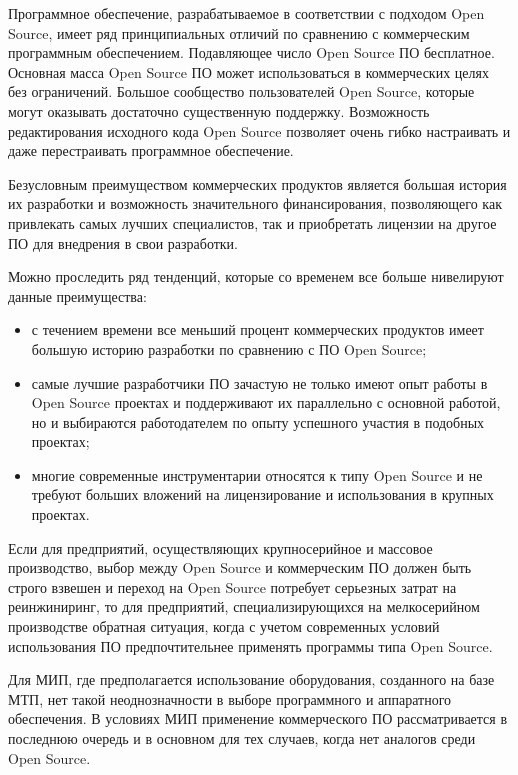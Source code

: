 Программное обеспечение, разрабатываемое в соответствии с подходом Open Source, имеет ряд принципиальных отличий по сравнению с коммерческим программным обеспечением. Подавляющее число Open Source ПО бесплатное. Основная масса Open Source ПО может использоваться в коммерческих целях без ограничений. Большое сообщество пользователей Open Source, которые могут оказывать достаточно существенную поддержку. Возможность редактирования исходного кода Open Source позволяет очень гибко настраивать и даже перестраивать программное обеспечение.

Безусловным преимуществом коммерческих продуктов является большая история их разработки и возможность значительного финансирования, позволяющего как привлекать самых лучших специалистов, так и приобретать лицензии на другое ПО для внедрения в свои разработки.

Можно проследить ряд тенденций, которые со временем все больше нивелируют данные преимущества:

\begin{itemize}
	\item с течением  времени все меньший процент коммерческих продуктов имеет большую историю разработки по сравнению с ПО Open Source;
	
	\item самые лучшие разработчики ПО зачастую не только имеют опыт работы в Open Source проектах и  поддерживают их параллельно с основной работой, но и выбираются работодателем по опыту успешного участия в подобных проектах;
	
	\item многие современные инструментарии относятся к типу Open Source и не требуют больших вложений на лицензирование и использования в крупных проектах.
\end{itemize}

Если для предприятий, осуществляющих крупносерийное и массовое производство, выбор между Open Source и коммерческим ПО должен быть строго взвешен и переход на Open Source потребует серьезных затрат на реинжиниринг, то для предприятий, специализирующихся на мелкосерийном производстве обратная ситуация, когда с учетом современных условий использования ПО предпочтительнее применять программы типа Open Source.

Для МИП, где предполагается использование оборудования, созданного на базе \foreignlanguage{english}{МТП}, нет такой неоднозначности в выборе программного и аппаратного обеспечения. В условиях МИП применение коммерческого ПО рассматривается в последнюю очередь и в основном для тех случаев, когда нет аналогов среди Open Source.


